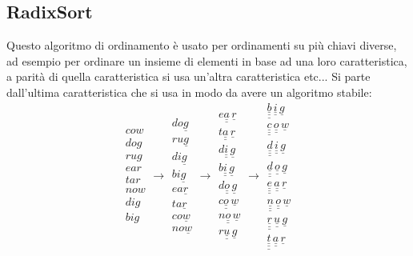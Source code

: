 \documentclass[a4paper,12pt,oneside,tikz]{book}
\begin{document}
\subsection{RadixSort}
Questo algoritmo di ordinamento è usato per ordinamenti su più chiavi diverse, ad esempio per ordinare un insieme di elementi in base ad una loro caratteristica, a parità di quella caratteristica si usa un'altra caratteristica etc... Si parte dall'ultima caratteristica che si usa in modo da avere un algoritmo stabile:
$$
\begin{matrix}
cow\\
dog\\
rug\\
ear\\
tar\\
now\\
dig\\
big
\end{matrix}\longrightarrow\begin{matrix}
do\underline{g}\\
ru\underline{g}\\
di\underline{g}\\
bi\underline{g}\\
ea\underline{r}\\
ta\underline{r}\\
co\underline{w}\\
no\underline{w}
\end{matrix}\longrightarrow \begin{matrix}
e\underline{\underline{a}}\,\underline{r}\\
t\underline{\underline{a}}\,\underline{r}\\
d\underline{\underline{i}}\,\underline{g}\\
b\underline{\underline{i}}\,\underline{g}\\
d\underline{\underline{o}}\,\underline{g}\\
c\underline{\underline{o}}\,\underline{w}\\
n\underline{\underline{o}}\,\underline{w}\\
r\underline{\underline{u}}\,\underline{g}
\end{matrix}\longrightarrow\begin{matrix}
\underline{\underline{\underline{b}}}\,\underline{\underline{i}}\,\underline{g}\\
\underline{\underline{\underline{c}}}\,\underline{\underline{o}}\,\underline{w}\\
\underline{\underline{\underline{d}}}\,\underline{\underline{i}}\,\underline{g}\\
\underline{\underline{\underline{d}}}\,\underline{\underline{o}}\,\underline{g}\\
\underline{\underline{\underline{e}}}\,\underline{\underline{a}}\,\underline{r}\\
\underline{\underline{\underline{n}}}\,\underline{\underline{o}}\,\underline{w}\\
\underline{\underline{\underline{r}}}\,\underline{\underline{u}}\,\underline{g}\\
\underline{\underline{\underline{t}}}\,\underline{\underline{a}}\,\underline{r}
\end{matrix}
$$
\end{document}
